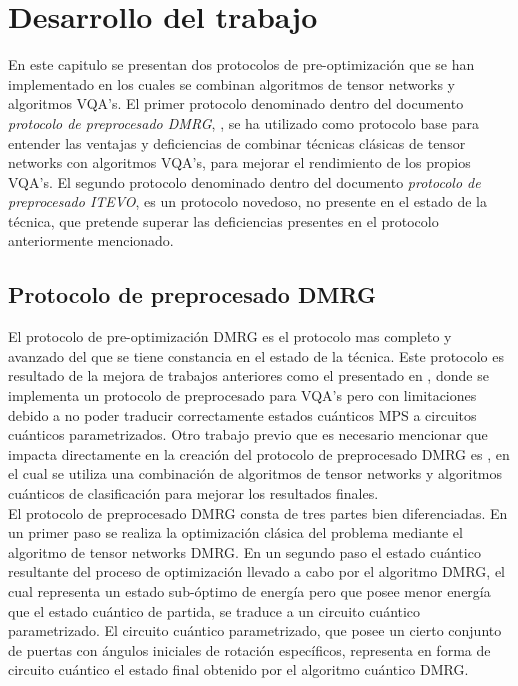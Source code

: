 \chapter{Desarrollo del trabajo}

En este capitulo se presentan dos protocolos de pre-optimización que se han implementado en los cuales se combinan algoritmos de tensor networks y algoritmos VQA's. El primer protocolo denominado dentro del documento \textit{protocolo de preprocesado DMRG}, \citep{manuel}, se ha utilizado como protocolo base para entender las ventajas y deficiencias de combinar técnicas clásicas de tensor networks con algoritmos VQA's, para mejorar el rendimiento de los propios VQA's. El segundo protocolo denominado dentro del documento \textit{protocolo de preprocesado ITEVO}, es un protocolo novedoso, no presente en el estado de la técnica, que pretende superar las deficiencias presentes en el protocolo anteriormente mencionado. 

\section{Protocolo de preprocesado DMRG}

El protocolo de pre-optimización DMRG es el protocolo mas completo y avanzado del que se tiene constancia en el estado de la técnica. Este protocolo es resultado de la mejora de trabajos anteriores como el presentado en \citep{dborin}, donde se implementa un protocolo de preprocesado para VQA's pero con limitaciones debido a no poder traducir correctamente estados cuánticos MPS a circuitos cuánticos parametrizados. Otro trabajo previo que es necesario mencionar que impacta directamente en la creación del protocolo de preprocesado DMRG es \citep{huggins}, en el cual se utiliza una combinación de algoritmos de tensor networks y algoritmos cuánticos de clasificación para mejorar los resultados finales. \\

El protocolo de preprocesado DMRG consta de tres partes bien diferenciadas. En un primer paso se realiza la optimización clásica del problema mediante el algoritmo de tensor networks DMRG. En un segundo paso el estado cuántico resultante del proceso de optimización llevado a cabo por el algoritmo DMRG, el cual representa un estado sub-óptimo de energía pero que posee menor energía que el estado cuántico de partida, se traduce a un circuito cuántico parametrizado. El circuito cuántico parametrizado, que posee un cierto conjunto de puertas con ángulos iniciales de rotación específicos, representa en forma de circuito cuántico el estado final obtenido por el algoritmo cuántico DMRG. \\

